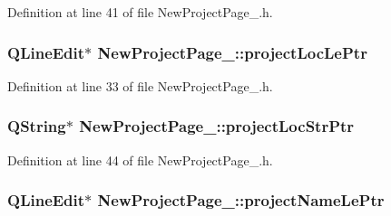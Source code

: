 Definition at line 41 of file New\-Project\-Page\-\_.\-h.

\hypertarget{class_new_project_page__2_a86200aed0b692c71dffa0664fa18e25e}{
\subsubsection[{project\-Loc\-Le\-Ptr}]{\setlength{\rightskip}{0pt plus 5cm}Q\-Line\-Edit$\ast$ New\-Project\-Page\-\_\-::project\-Loc\-Le\-Ptr\hspace{0.3cm}{\ttfamily [private]}}}\label{class_new_project_page__2_a86200aed0b692c71dffa0664fa18e25e}


Definition at line 33 of file New\-Project\-Page\-\_.\-h.

\hypertarget{class_new_project_page__2_aeef81f262fde93b45f7264515bee334d}{
\subsubsection[{project\-Loc\-Str\-Ptr}]{\setlength{\rightskip}{0pt plus 5cm}Q\-String$\ast$ New\-Project\-Page\-\_\-::project\-Loc\-Str\-Ptr\hspace{0.3cm}{\ttfamily [private]}}}\label{class_new_project_page__2_aeef81f262fde93b45f7264515bee334d}


Definition at line 44 of file New\-Project\-Page\-\_.\-h.

\hypertarget{class_new_project_page__2_a8d955d78824c84ca7943b1af2ace11b0}{
\subsubsection[{project\-Name\-Le\-Ptr}]{\setlength{\rightskip}{0pt plus 5cm}Q\-Line\-Edit$\ast$ New\-Project\-Page\-\_\-::project\-Name\-Le\-Ptr\hspace{0.3cm}{\ttfamily [private]}}}\label{class_new_project_page__2_a8d955d78824c84ca7943b1af2ace11b0}



